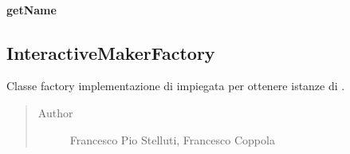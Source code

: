 \documentclass[letterpaper,10pt,italian,openany,oneside]{sphinxmanual}
\begin{document}
\paragraph{getName}
\label{\detokenize{source/it/unicam/cs/pa/mastermind/factories/InteractiveBreakerFactory:getname}}

\begin{fulllineitems}
\label{\detokenize{source/it/unicam/cs/pa/mastermind/factories/InteractiveBreakerFactory:it.unicam.cs.pa.mastermind.factories.InteractiveBreakerFactory.getName()}}
\end{fulllineitems}



\subsection{InteractiveMakerFactory}
\label{\detokenize{source/it/unicam/cs/pa/mastermind/factories/InteractiveMakerFactory:interactivemakerfactory}}\label{\detokenize{source/it/unicam/cs/pa/mastermind/factories/InteractiveMakerFactory::doc}}

\begin{fulllineitems}
\label{\detokenize{source/it/unicam/cs/pa/mastermind/factories/InteractiveMakerFactory:it.unicam.cs.pa.mastermind.factories.InteractiveMakerFactory}}
Classe factory implementazione di  impiegata per ottenere istanze di .
\begin{quote}\begin{description}
\item[{Author}] \leavevmode
Francesco Pio Stelluti, Francesco Coppola

\end{description}\end{quote}

\end{fulllineitems}
\end{document}
